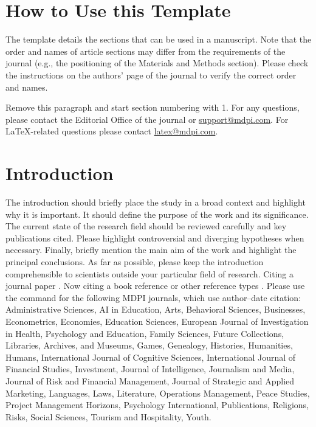 \documentclass[journal,article,submit,moreauthors]{Definitions/mdpi}
\begin{document}
\setcounter{section}{-1} %
\section{How to Use this Template}

The template details the sections that can be used in a manuscript. Note that the order and names of article sections may differ from the requirements of the journal (e.g., the positioning of the Materials and Methods section). Please check the instructions on the authors' page of the journal to verify the correct order and names. 

Remove this paragraph and start section numbering with 1. For any questions, please contact the Editorial Office of the journal or \href{mailto:support@mdpi.com}{support@mdpi.com}. For LaTeX-related questions please contact \href{mailto:latex@mdpi.com}{latex@mdpi.com}.%


\section{Introduction}

The introduction should briefly place the study in a broad context and highlight why it is important. It should define the purpose of the work and its significance. The current state of the research field should be reviewed carefully and key publications cited. Please highlight controversial and diverging hypotheses when necessary. Finally, briefly mention the main aim of the work and highlight the principal conclusions. As far as possible, please keep the introduction comprehensible to scientists outside your particular field of research. Citing a journal paper \citep{ref-journal}.  Now citing a book reference \citep{ref-book1,ref-book2} or other reference types \citep{ref-unpublish,ref-url}. Please use the command \citep{ref-proceeding,ref-thesis} for the following MDPI journals, which use author--date citation: Administrative Sciences, AI in Education, Arts, Behavioral Sciences, Businesses, Econometrics, Economies, Education Sciences, European Journal of Investigation in Health, Psychology and Education, Family Sciences, Future Collections, Libraries, Archives, and Museums, Games, Genealogy, Histories, Humanities, Humans, International Journal of Cognitive Sciences, International Journal of Financial Studies, Investment, Journal of Intelligence, Journalism and Media, Journal of Risk and Financial Management, Journal of Strategic and Applied Marketing, Languages, Laws, Literature, Operations Management, Peace Studies, Project Management Horizons, Psychology International, Publications, Religions, Risks, Social Sciences, Tourism and Hospitality, Youth. 
\end{document}
